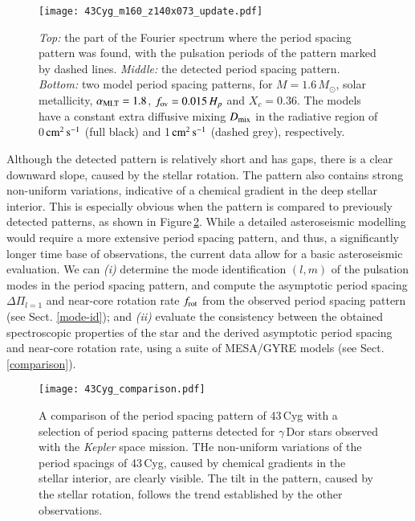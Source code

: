 \documentclass{aa}
\begin{document}
\begin{figure*}
	\begin{center}
\texttt{[image: 43Cyg\_m160\_z140x073\_update.pdf]}
 	\caption{{\em Top:} the part of the Fourier spectrum where the period spacing pattern was found, with the pulsation periods of the pattern marked by dashed lines. {\em Middle:} the detected period spacing pattern. {\em Bottom:} two model period spacing patterns, for $M = 1.6\,M_\odot$, solar metallicity, $\alpha_{\rm MLT} = 1.8$, $f_{\rm ov} = 0.015\,H_p$ and $X_c = 0.36$. The models have a constant extra diffusive mixing $D_{\rm mix}$ in the radiative region of 0\,$\rm cm^2\,s^{-1}$ (full black) and 1\,$\rm cm^2\,s^{-1}$ (dashed grey), respectively.} 
	\label{fig:43Cyg_spdet} 
	\end{center} 
\end{figure*}



Although the detected pattern is relatively short and has gaps, there is a clear downward slope, caused by the stellar rotation. The pattern also contains strong non-uniform variations, indicative of a chemical gradient in the deep stellar interior. This is especially obvious when the pattern is compared to previously detected patterns, as shown in Figure\,\ref{fig:compar}. 
While a detailed asteroseismic modelling would require a more 
extensive period spacing pattern, and thus, a significantly longer 
time base of observations, the current data allow for a basic 
asteroseismic evaluation. We can \emph{(i)} determine the mode 
identification $(l,m)$ of the pulsation modes in the period spacing 
pattern, and compute the asymptotic period spacing
 $\Delta\Pi_{l=1}$ and near-core rotation rate $f_{\rm rot}$ from the observed period spacing pattern (see Sect. \ref{mode-id}); and {\em (ii)} evaluate the consistency between the obtained spectroscopic properties of the star and the derived asymptotic period spacing and near-core rotation rate, using a suite of MESA/GYRE models (see Sect. \ref{comparison}).

\begin{figure*}
	\begin{center}
\texttt{[image: 43Cyg\_comparison.pdf]}
 	\caption{A comparison of the period spacing pattern of 43\,Cyg with a selection of period spacing patterns detected for $\gamma$\,Dor stars observed with the {\em Kepler} space mission. THe non-uniform variations of the period spacings of 43\,Cyg, caused by chemical gradients in the stellar interior, are clearly visible. The tilt in the pattern, caused by the stellar rotation, follows the trend established by the other observations.} 
	\label{fig:compar} 
	\end{center} 
\end{figure*}
\end{document}
